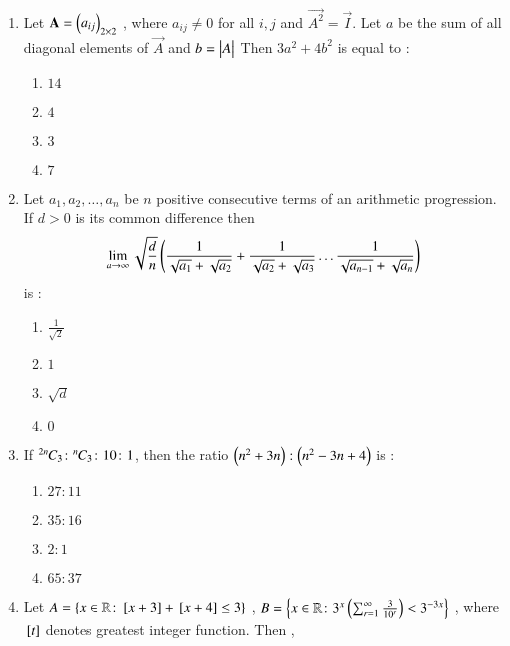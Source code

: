\documentclass[journal,12pt,onecolumn]{IEEEtran}
\theoremstyle{remark}
\begin{document}
\begin{enumerate}
    \item Let $\mathbf{A} = \begin{pmatrix}a_{ij}\end{pmatrix}_{2 \times 2}$ , where $a_{ij} \neq 0$ for all $i , j$ and $\vec{A^2} = \vec{I}$. Let $a$ be the sum of all diagonal elements of $\vec{A}$ and $b = \begin{vmatrix}A\end{vmatrix}$ Then $3a^2 + 4b^2$ is equal to :
    \begin{multicols}{2}
    \begin{enumerate}
        \item $14$
        \item $4$\\
        \item $3$
        \item $7$
    \end{enumerate}
    \end{multicols}
    \item Let $a_1 , a_2 , \dots , a_n$ be $n$ positive consecutive terms of an arithmetic progression. If $d > 0$ is its common difference then 
    \begin{align}
    \lim\limits_{a \rightarrow \infty} \sqrt{\frac{d}{n}}\left(\frac{1}{\sqrt{a_1}+\sqrt{a_2}} + \frac{1}{\sqrt{a_2}+\sqrt{a_3}} \dots \frac{1}{\sqrt{a_{n-1}}+\sqrt{a_n}}\right)
    \end{align}
    is : 
    \begin{multicols}{2}
    \begin{enumerate}
        \item $\frac{1}{\sqrt{2}}$
        \item $1$\\
        \item $\sqrt{d}$
        \item $0$
    \end{enumerate}
    \end{multicols}
    \item If ${{}^{2n}\mkern-1muC_{3}} \colon {{}^{n}\mkern-1muC_{3}} \colon 10 \colon 1$, then the ratio $\left(n^2 + 3n\right) : \left(n^2 - 3n +4\right)$ is :
    \begin{multicols}{2}
    \begin{enumerate}
        \item $27 \colon 11$
        \item $35 \colon 16$\\
        \item $2 \colon 1$
        \item $65 \colon 37$
    \end{enumerate}
    \end{multicols}
    \item Let $A = \left\{ x \in \mathbb{R} \colon {}\left[x+3\right] + {}\left[x+4\right] \leq 3\right\}$ , $ B = \left\{ x \in \mathbb{R} \colon 3^x \left(\sum_{r=1}^\infty\frac{3}{10^r} \right)< 3 ^{-3x}\right\}$ , where ${}\left[t\right]$ denotes greatest integer function. Then ,

\end{enumerate}
\end{document}
